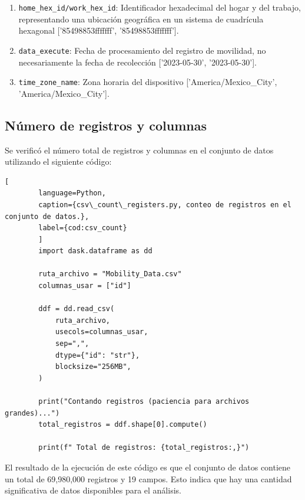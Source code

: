 \begin{enumerate}[leftmargin=*, align=left, noitemsep]
    \item \texttt{home\_hex\_id/work\_hex\_id}: Identificador hexadecimal del hogar y del trabajo, representando una ubicación geográfica en un sistema de cuadrícula hexagonal ['85498853fffffff', '85498853fffffff'].
    \item \texttt{data\_execute}: Fecha de procesamiento del registro de movilidad, no necesariamente la fecha de recolección ['2023-05-30', '2023-05-30'].
    \item \texttt{time\_zone\_name}: Zona horaria del dispositivo ['America\textdollar/Mexico\_City', 'America/Mexico\_City'].
\end{enumerate}

\newpage
\subsection{Número de registros y columnas}
\noindent Se verificó el número total de registros y columnas en el conjunto de datos utilizando el siguiente código:

    \begin{lstlisting}[
        language=Python,
        caption={csv\_count\_registers.py, conteo de registros en el conjunto de datos.},
        label={cod:csv_count}
        ]
        import dask.dataframe as dd

        ruta_archivo = "Mobility_Data.csv" 
        columnas_usar = ["id"]  

        ddf = dd.read_csv(
            ruta_archivo,
            usecols=columnas_usar, 
            sep=",",             
            dtype={"id": "str"},  
            blocksize="256MB",   
        )

        print("Contando registros (paciencia para archivos grandes)...")
        total_registros = ddf.shape[0].compute() 

        print(f" Total de registros: {total_registros:,}")
    \end{lstlisting}

\noindent El resultado de la ejecución de este código es que el conjunto de datos contiene un total de 69,980,000 registros y 19 campos. Esto indica que hay una cantidad significativa de datos disponibles para el análisis.

